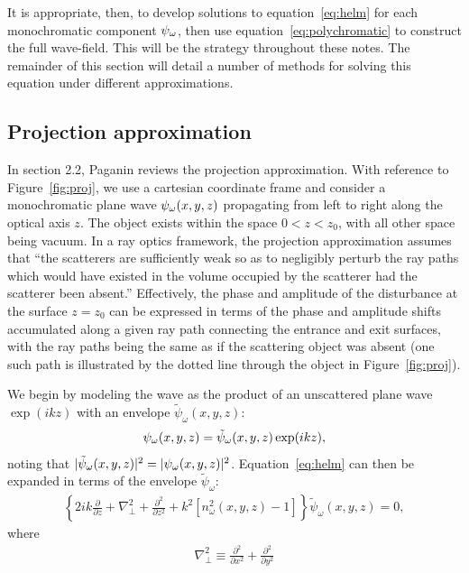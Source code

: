 \documentclass{article}
\begin{document}
It is appropriate, then, to develop solutions to equation~\ref{eq:helm} for each
monochromatic component $\psi_{\omega}$, then use equation~\ref{eq:polychromatic} to
construct the full wave-field. This will be the strategy throughout these
notes. The remainder of this section will detail a number of methods for solving
this equation under different approximations.

\subsection{Projection approximation}

In section 2.2, Paganin reviews the projection approximation. With reference to
Figure~\ref{fig:proj}, we use a cartesian coordinate frame and consider a
monochromatic plane wave $\psi_{\omega}(x,y,z)$ propagating from left to right along
the optical axis $z$. The object exists within the space $0 < z < z_0$, with all
other space being vacuum. In a ray optics framework, the projection
approximation assumes that ``the scatterers are sufficiently weak so as to
negligibly perturb the ray paths which would have existed in the volume occupied
by the scatterer had the scatterer been absent.'' Effectively, the phase and
amplitude of the disturbance at the surface $z=z_0$ can be expressed in terms of
the phase and amplitude shifts accumulated along a given ray path connecting the
entrance and exit surfaces, with the ray paths being the same as if the
scattering object was absent (one such path is illustrated by the dotted line
through the object in Figure~\ref{fig:proj}).

We begin by modeling the wave as the product of an unscattered plane wave
$\exp(ikz)$ with an envelope $\tilde{\psi}_{\omega}(x,y,z)$:
\begin{align}
  \psi_{\omega}(x,y,z) = \tilde{\psi}_{\omega}(x,y,z)\exp(ikz),
  \label{eq:envelope}
\end{align}
noting that $|\tilde{\psi}_{\omega}(x,y,z)|^2 =
|\psi_{\omega}(x,y,z)|^2$. Equation~\ref{eq:helm} can then be expanded in terms of the
envelope $\tilde{\psi}_{\omega}$:
\begin{align}
  \left\{2ik\frac{\partial}{\partial z} + \nabla_{\perp}^2 + \frac{\partial^2}{\partial z^2} + k^2\left[n_{\omega}^2(x,y,z) - 1\right]\right\}\tilde{\psi}_{\omega}(x,y,z) = 0,
  \label{eq:helm2}
\end{align}
where
\begin{align}
  \nabla^2_{\perp} \equiv \frac{\partial^2}{\partial x^2} + \frac{\partial^2}{\partial y^2}
\end{align}
\end{document}
